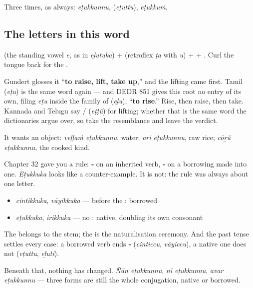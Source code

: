 Three times, as always: \emph{eṭukkunnu}, \textbf{} (\emph{eṭuttu}), \emph{eṭukkuṁ}.

\subsection*{The letters in this word}
\textbf{} (the standing vowel \emph{e}, as in \emph{eḻutuka}) + \textbf{} (retroflex \textbf{} \emph{ṭa} with \emph{u}) + \textbf{} + \textbf{}. Curl the tongue back for the \textbf{}.

\begin{cousinweb}
Gundert glosses it \textquotedblleft{}\textbf{to raise, lift, take up},\textquotedblright{} and the lifting came first. Tamil \textbf{} (\emph{eṭu}) is the same word again — and DEDR 851 gives this root no entry of its own, filing \emph{eṭu} inside the family of \textbf{} (\emph{eḻu}), \textquotedblleft{}\textbf{to rise}.\textquotedblright{} Rise, then raise, then take. Kannada and Telugu say \textbf{} / \textbf{} (\emph{eṭṭŭ}) for lifting; whether that is the same word the dictionaries argue over, so take the resemblance and leave the verdict.

It wants an object: \emph{veḷḷaṁ eṭukkunnu}, water; \emph{ari eṭukkunnu}, raw rice; \emph{cōṟŭ eṭukkunnu}, the cooked kind.
\end{cousinweb}

\begin{grammarlens}[title={Grammar Lens: the stamp is the \ml{ഇ}, not the \ml{ക്ക}}]
Chapter 32 gave you a rule: \textbf{‑} on an inherited verb, \textbf{‑} on a borrowing made into one. \emph{Eṭukkuka} looks like a counter-example. It is not: the rule was always about one letter.

\begin{itemize}
\raggedright
  \item \emph{cintikkuka}, \emph{vāyikkuka} — \textbf{} before the \textbf{}: borrowed
  \item \emph{eṭukkuka}, \emph{irikkuka} — no \textbf{}: native, doubling its own consonant
\end{itemize}

The \textbf{} belongs to the stem; the \textbf{} is the naturalisation ceremony. And the past tense settles every case: a borrowed verb ends \textbf{‑} (\emph{cinticcu}, \emph{vāyiccu}), a native one does not (\emph{eṭuttu}, \emph{eḻuti}).

Beneath that, nothing has changed. \emph{Ñān eṭukkunnu}, \emph{nī eṭukkunnu}, \emph{avar eṭukkunnu} — three forms are still the whole conjugation, native or borrowed.
\end{grammarlens}

